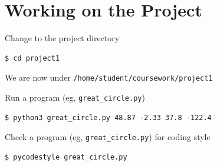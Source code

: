 \documentclass[8pt,a4paper,compress]{beamer}
\begin{document}
\section{Working on the Project}
\begin{frame}[fragile]
\pause

Change to the project directory

\begin{tcolorbox}[enhanced,drop shadow southwest,sharp corners,size=fbox,colback=black]
\begin{lstlisting}[style=terminal]
$ cd project1
\end{lstlisting}
\end{tcolorbox}

\pause\bigskip

We are now under \lstinline{/home/student/coursework/project1}

\pause\bigskip

Run a program (eg, \lstinline{great_circle.py})

\begin{tcolorbox}[enhanced,drop shadow southwest,sharp corners,size=fbox,colback=black]
\begin{lstlisting}[style=terminal]
$ python3 great_circle.py 48.87 -2.33 37.8 -122.4
\end{lstlisting}
\end{tcolorbox}

\pause\bigskip

Check a program (eg, \lstinline{great_circle.py}) for coding style

\begin{tcolorbox}[enhanced,drop shadow southwest,sharp corners,size=fbox,colback=black]
\begin{lstlisting}[style=terminal]
$ pycodestyle great_circle.py
\end{lstlisting}
\end{tcolorbox}
\end{frame}
\end{document}

